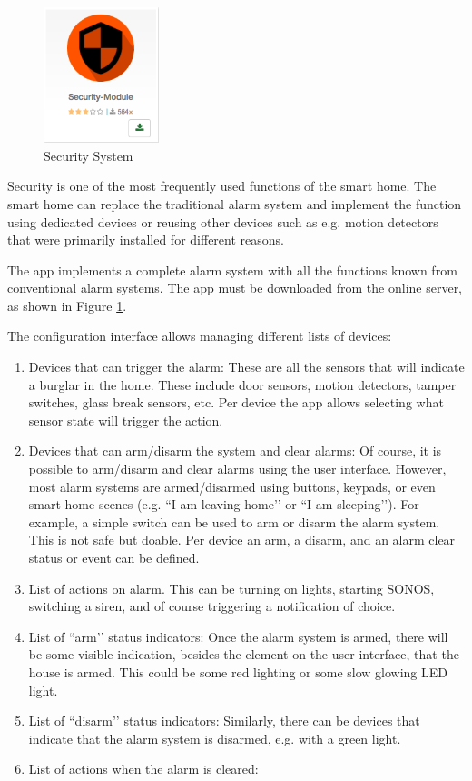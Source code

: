 \begin{figure}
\begin{center}
\includegraphics[width=0.3\textwidth]{pngs/cap6/app22.png}
\caption{Security System}
\label{app22}
\end{center}
\end{figure}

Security is one of the most frequently used functions of the smart home. The smart home 
can replace the traditional alarm system and implement the function using dedicated devices 
or reusing other devices such as e.g. motion detectors that were primarily installed for 
different reasons.

The app  implements a complete alarm system with all the functions 
known from conventional alarm systems. The app must be downloaded from the online server, 
as shown in Figure \ref{app22}.

The configuration interface allows managing different lists of devices:

\begin{enumerate}
\item Devices that can trigger the alarm: These are all the sensors that will indicate a 
burglar in the home. These include door sensors, motion detectors, tamper switches, 
glass break sensors, etc. Per device the app allows selecting what sensor state will 
trigger the action.
\item Devices that can arm/disarm the system and clear alarms: Of course, it is possible 
to arm/disarm and clear alarms using the user interface. However, most alarm systems 
are armed/disarmed using buttons, keypads, or even smart home scenes (e.g. ``I am 
leaving home’’ or ``I am sleeping’’). For example, a simple switch can be used to arm or 
disarm the alarm system. This is not safe but doable. Per device an arm, a disarm, and 
an alarm clear status or event can be defined.
\item List of actions on alarm. This can be turning on lights, starting SONOS, switching 
a siren, and of course triggering a notification of choice.
\item List of ``arm’’ status indicators: Once the alarm system is armed, there will be 
some visible indication, besides the element on the user interface, that the house is 
armed. This could be some red lighting or some slow glowing LED light.
\item List of ``disarm’’ status indicators: Similarly, there can be devices that indicate 
that the alarm system is disarmed, e.g. with a green light.
\item List of actions when the alarm is cleared:
\end{enumerate}

